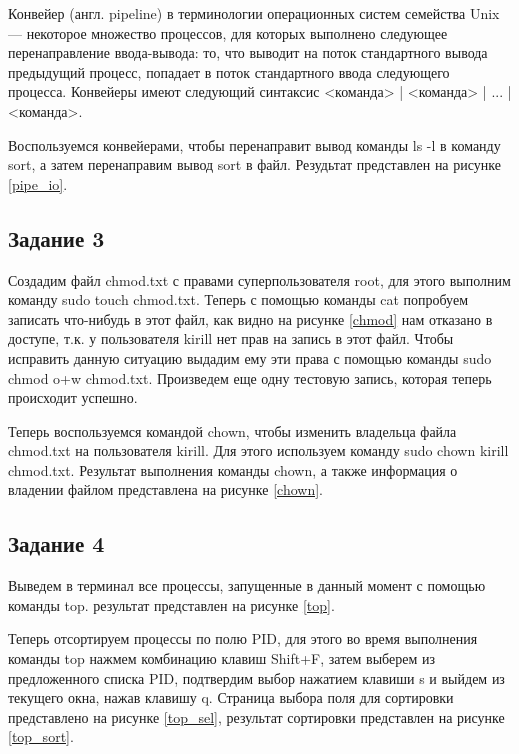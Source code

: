 Конвейер (англ. pipeline) в терминологии операционных систем семейства Unix — некоторое множество процессов, для которых выполнено следующее перенаправление ввода-вывода: то, что выводит на поток стандартного вывода предыдущий процесс, попадает в поток стандартного ввода следующего процесса. Конвейеры имеют следующий синтаксис <команда> | <команда> | ... | <команда>.

Воспользуемся конвейерами, чтобы перенаправит вывод команды ls -l в команду sort, а затем перенаправим вывод sort в файл. Резудьтат представлен на рисунке \ref{pipe_io}.


\newpage
\subsection{Задание 3}


Создадим файл chmod.txt с правами суперпользователя root, для этого выполним команду sudo touch chmod.txt. Теперь с помощью команды cat попробуем записать что-нибудь в этот файл, как видно на рисунке \ref{chmod} нам отказано в доступе, т.к. у пользователя kirill нет прав на запись в этот файл. Чтобы исправить данную ситуацию выдадим ему эти права с помощью команды sudo chmod o+w chmod.txt. Произведем еще одну тестовую запись, которая теперь происходит успешно. 

Теперь воспользуемся командой chown, чтобы изменить владельца файла chmod.txt на пользователя kirill. Для этого используем команду sudo chown kirill chmod.txt. Результат выполнения команды chown, а также информация о владении файлом представлена на рисунке \ref{chown}.


\subsection{Задание 4}

Выведем в терминал все процессы, запущенные в данный момент с помощью команды top. результат представлен на рисунке \ref{top}.


Теперь отсортируем процессы по полю PID, для этого во время выполнения команды top нажмем комбинацию клавиш Shift+F, затем выберем из предложенного списка PID, подтвердим выбор нажатием клавиши s и выйдем из текущего окна, нажав клавишу q. Страница выбора поля для сортировки представлено на рисунке \ref{top_sel}, результат сортировки представлен на рисунке \ref{top_sort}.

